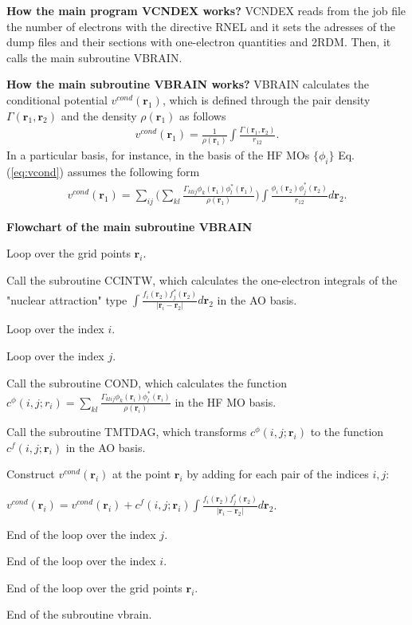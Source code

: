 \documentclass[onecolumn,preprintnumbers,amsmath,amssymb]{revtex4}
\newcommand{\mb}[1]{\boldsymbol{#1}}
\newcommand{\br}{\mb{r}}
\begin{document}
\textbf{How the main program VCNDEX works?} VCNDEX reads from the job file the number of electrons with the directive RNEL and it sets the adresses of the dump files  and their sections with one-electron quantities and 2RDM. Then, it calls the main subroutine VBRAIN.

\textbf{How the main subroutine VBRAIN works?} VBRAIN calculates the conditional potential $v^{cond}(\br_1)$, which is defined through the pair density $\Gamma(\br_1,\br_2)$ and the density $\rho(\br_1)$ as follows
\begin{align}
\label{eq:vcond}
v^{cond}(\br_1) = \frac{1}{\rho(\br_1)}\int \frac{\Gamma(\br_1,\br_2)}{r_{12}}.
\end{align}      
In a particular basis, for instance, in the basis of the HF MOs $\{\phi_i\}$ Eq.(\ref{eq:vcond}) assumes the following form
\begin{align}
\label{eq:vcondao}
v^{cond}(\br_1) = \sum_{ij}\biggl(\sum_{kl} \frac{\Gamma_{klij}\phi_k(\br_1)\phi_l^*(\br_1)}{\rho(\br_1)}\biggr)\int \frac{\phi_i(\br_2)\phi_j^*(\br_2)}{r_{12}}d\br_2.
\end{align}      

\textbf{Flowchart of the main subroutine VBRAIN}

Loop over the grid points $\br_i$.

Call the subroutine CCINTW, which calculates the one-electron integrals of the "nuclear attraction" type $\int \frac{f_i(\br_2)f_j^*(\br_2)}{|\br_i - \br_2|}d\br_2$ in the AO basis.

Loop over the index $i$. 

Loop over the index $j$.

Call the subroutine COND, which calculates the function $c^{\phi}(i,j;r_i) = \sum_{kl} \frac{\Gamma_{klij}\phi_k(\br_i)\phi_l^*(\br_i)}{\rho(\br_i)}$ in the HF MO basis.

Call the subroutine TMTDAG, which transforms $c^{\phi}(i,j;\br_i)$ to the function $c^f(i,j;\br_i)$ in the AO basis.

Construct $v^{cond}(\br_i)$ at the point $\br_i$ by adding for each pair of the indices $i,j$: 

$v^{cond}(\br_i) = v^{cond}(\br_i) + c^f(i,j;\br_i) \int \frac{f_i(\br_2)f_j^*(\br_2)}{|\br_i - \br_2|}d\br_2$. 

End of the loop over the index $j$.

End of the loop over the index $i$.

End of the loop over the grid points $\br_i$.

End of the subroutine vbrain.
\end{document}
